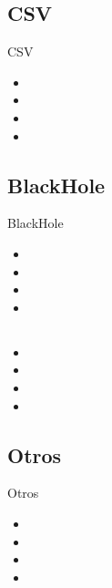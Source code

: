 \subsection{CSV}
\begin{frame}{CSV}
  \begin{itemize}
    \item 
    \item 
    \item 
    \item 
  \end{itemize}
\end{frame}

\subsection{BlackHole}
\begin{frame}{BlackHole}
  \begin{itemize}
    \item 
    \item 
    \item 
    \item 
  \end{itemize}
\end{frame}

\subsection{}
\begin{frame}{}
  \begin{itemize}
    \item 
    \item 
    \item 
    \item 
  \end{itemize}
\end{frame}

\subsection{Otros}
\begin{frame}{Otros}
  \begin{itemize}
    \item 
    \item 
    \item 
    \item 
  \end{itemize}
\end{frame}
